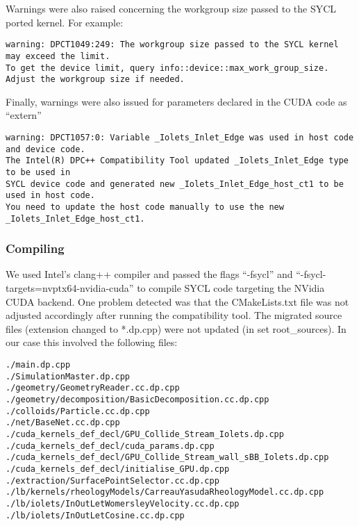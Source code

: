 \documentclass[../main]{subfiles}
\begin{document}
Warnings were also raised concerning the workgroup size passed to the SYCL ported kernel.
For example:
\begin{footnotesize}
	\begin{verbatim}
warning: DPCT1049:249: The workgroup size passed to the SYCL kernel may exceed the limit.
To get the device limit, query info::device::max_work_group_size.
Adjust the workgroup size if needed.
\end{verbatim}
\end{footnotesize}

Finally, warnings were also issued for parameters declared in the CUDA code as ``extern''
\begin{footnotesize}
	\begin{verbatim}
warning: DPCT1057:0: Variable _Iolets_Inlet_Edge was used in host code and device code.
The Intel(R) DPC++ Compatibility Tool updated _Iolets_Inlet_Edge type to be used in
SYCL device code and generated new _Iolets_Inlet_Edge_host_ct1 to be used in host code.
You need to update the host code manually to use the new _Iolets_Inlet_Edge_host_ct1.
\end{verbatim}
\end{footnotesize}

\subsubsection{Compiling}
We used Intel’s clang++ compiler and passed the flags ``-fsycl'' and ``-fsycl-targets=nvptx64-nvidia-cuda'' to compile SYCL code targeting the NVidia CUDA backend.
One problem detected was that the CMakeLists.txt file was not adjusted accordingly after running the  compatibility tool.
The migrated source files (extension changed to *.dp.cpp) were not updated (in set root\_sources).
In our case this involved the following files:
\begin{footnotesize}
	\begin{verbatim}
./main.dp.cpp
./SimulationMaster.dp.cpp
./geometry/GeometryReader.cc.dp.cpp
./geometry/decomposition/BasicDecomposition.cc.dp.cpp
./colloids/Particle.cc.dp.cpp
./net/BaseNet.cc.dp.cpp
./cuda_kernels_def_decl/GPU_Collide_Stream_Iolets.dp.cpp
./cuda_kernels_def_decl/cuda_params.dp.cpp
./cuda_kernels_def_decl/GPU_Collide_Stream_wall_sBB_Iolets.dp.cpp
./cuda_kernels_def_decl/initialise_GPU.dp.cpp
./extraction/SurfacePointSelector.cc.dp.cpp
./lb/kernels/rheologyModels/CarreauYasudaRheologyModel.cc.dp.cpp
./lb/iolets/InOutLetWomersleyVelocity.cc.dp.cpp
./lb/iolets/InOutLetCosine.cc.dp.cpp
\end{verbatim}
\end{footnotesize}
\end{document}
